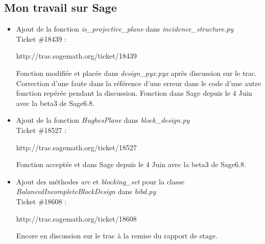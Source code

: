 \documentclass[a4paper]{article}
\begin{document}
\subsection*{Mon travail sur Sage}
\begin{itemize}
\item Ajout de la fonction \textit{is\_projective\_plane} dans \textit{incidence\_structure.py}\\
  Ticket \#18439 :\\
  \begin{sageverbatim}
 http://trac.sagemath.org/ticket/18439
  \end{sageverbatim}
 Fonction modifiée et placée dans \textit{design\_pyx.pyx} après discussion sur le trac. Correction d'une faute dans la référence d'une erreur dans le code d'une autre fonction repérée pendant la discussion. Fonction dans Sage depuis le 4 Juin avec la beta3 de Sage6.8.\vspace{1\baselineskip}\\
\item Ajout de la fonction \textit{HughesPlane} dans \textit{block\_design.py}\\
  Ticket \#18527 :\\
  \begin{sageverbatim}
 http://trac.sagemath.org/ticket/18527
    \end{sageverbatim}
  Fonction acceptée et dans Sage depuis le 4 Juin avec la beta3 de Sage6.8.\vspace{1\baselineskip}\\
\item Ajout des méthodes \textit{arc} et \textit{blocking\_set} pour la classe \textit{BalancedIncompleteBlockDesign} dans \textit{bibd.py}\\
  Ticket \#18608 :\\
\begin{sageverbatim}
 http://trac.sagemath.org/ticket/18608
\end{sageverbatim}
\vspace{1\baselineskip}
  Encore en discussion sur le trac à la remise du rapport de stage.\\
\end{itemize}  
\end{document}
